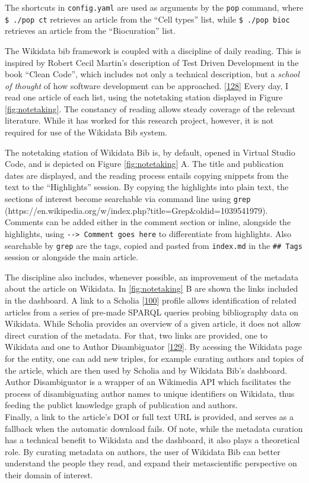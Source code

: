 The shortcuts in \texttt{config.yaml} are used as arguments by the \texttt{pop} command, where \texttt{\$\ ./pop\ ct} retrieves an article from the ``Cell types'' list, while \texttt{\$\ ./pop\ bioc} retrieves an article from the ``Biocuration'' list.

The Wikidata bib framework is coupled with a discipline of daily reading.
This is inspired by Robert Cecil Martin's description of Test Driven Development in the book ``Clean Code'', which includes not only a technical description, but a \emph{school of thought} of how software development can be approached. {[}\protect\hyperlink{ref-13HqB23xH}{128}{]}
Every day, I read one article of each list, using the notetaking station displayed in Figure \ref{fig:notetaking}.
The constancy of reading allows steady coverage of the relevant literature.
While it has worked for this research project, however, it is not required for use of the Wikidata Bib system.

The notetaking station of Wikidata Bib is, by default, opened in Virtual Studio Code, and is depicted on Figure \ref{fig:notetaking} A.
The title and publication dates are displayed, and the reading process entails copying snippets from the text to the ``Highlights'' session.
By copying the highlights into plain text, the sections of interest become searchable via command line using \texttt{grep} (https://en.wikipedia.org/w/index.php?title=Grep\&oldid=1039541979).
Comments can be added either in the comment section or inline, alongside the highlights, using \texttt{-\/-\textgreater{}\ Comment\ goes\ here} to differentiate from highlights.
Also searchable by \texttt{grep} are the tags, copied and pasted from \texttt{index.md} in the \texttt{\#\#\ Tags} session or alongside the main article.

The discipline also includes, whenever possible, an improvement of the metadata about the article on Wikidata.
In \ref{fig:notetaking} B are shown the links included in the dashboard.
A link to a Scholia {[}\protect\hyperlink{ref-hxzL9pmm}{100}{]} profile allows identification of related articles from a series of pre-made SPARQL queries probing bibliography data on Wikidata.
While Scholia provides an overview of a given article, it does not allow direct curation of the metadata.
For that, two links are provided, one to Wikidata and one to Author Disambiguator {[}\protect\hyperlink{ref-1A9RvszKC}{129}{]}.
By acessing the Wikidata page for the entity, one can add new triples, for example curating authors and topics of the article, which are then used by Scholia and by Wikidata Bib's dashboard.
Author Disambiguator is a wrapper of an Wikimedia API which facilitates the process of disambiguating author names to unique identifiers on Wikidata, thus feeding the publict knowledge graph of publication and authors.\\
Finally, a link to the article's DOI or full text URL is provided, and serves as a fallback when the automatic download fails.
Of note, while the metadata curation has a technical benefit to Wikidata and the dashboard, it also plays a theoretical role.
By curating metadata on authors, the user of Wikidata Bib can better understand the people they read, and expand their metascientific perspective on their domain of interest.

